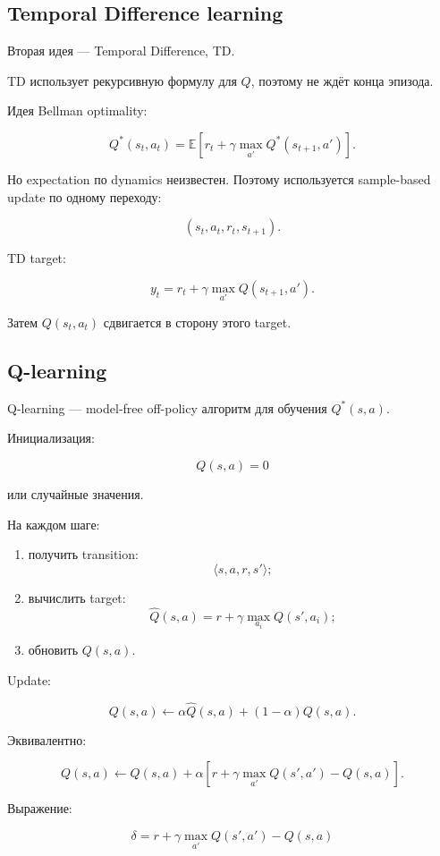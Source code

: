 \documentclass[a4paper,12pt]{article}
\begin{document}
\subsection{Temporal Difference learning}

Вторая идея --- Temporal Difference, TD.

TD использует рекурсивную формулу для \(Q\), поэтому не ждёт конца эпизода.

Идея Bellman optimality:

\[
Q^*(s_t,a_t)
=
\mathbb{E}
\left[
r_t
+
\gamma
\max_{a'} Q^*(s_{t+1},a')
\right].
\]

Но expectation по dynamics неизвестен. Поэтому используется sample-based update по одному переходу:

\[
(s_t,a_t,r_t,s_{t+1}).
\]

TD target:

\[
y_t
=
r_t
+
\gamma
\max_{a'} Q(s_{t+1},a').
\]

Затем \(Q(s_t,a_t)\) сдвигается в сторону этого target.

\subsection{Q-learning}

Q-learning --- model-free off-policy алгоритм для обучения \(Q^*(s,a)\).

Инициализация:

\[
Q(s,a)=0
\]

или случайные значения.

На каждом шаге:

\begin{enumerate}
    \item получить transition:
    \[
    \langle s,a,r,s' \rangle;
    \]
    \item вычислить target:
    \[
    \hat{Q}(s,a)
    =
    r
    +
    \gamma
    \max_{a_i} Q(s',a_i);
    \]
    \item обновить \(Q(s,a)\).
\end{enumerate}

Update:

\[
Q(s,a)
\leftarrow
\alpha \hat{Q}(s,a)
+
(1-\alpha)Q(s,a).
\]

Эквивалентно:

\[
Q(s,a)
\leftarrow
Q(s,a)
+
\alpha
\left[
r
+
\gamma
\max_{a'}Q(s',a')
-
Q(s,a)
\right].
\]

Выражение:

\[
\delta
=
r
+
\gamma
\max_{a'}Q(s',a')
-
Q(s,a)
\]
\end{document}
